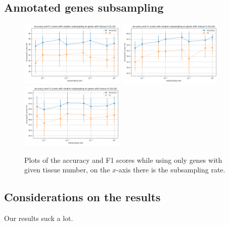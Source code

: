 \subsection{Annotated genes subsampling}
\begin{figure}[ht]
    \begin{center}
\includegraphics[width=5cm]{figures/subsample_ntissue_0.png}
\includegraphics[width=5cm]{figures/subsample_ntissue_10.png}
\includegraphics[width=5cm]{figures/subsample_ntissue_20.png}
    \end{center}
\caption{Plots of the accuracy and F1 scores while using only genes with given tissue number, on the $x$-axis there is the subsampling rate.}
\label{fig:res3}
\end{figure}

\subsection{Considerations on the results}
Our results suck a lot.
